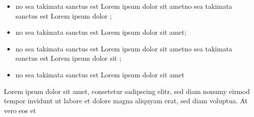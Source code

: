 \documentclass[]{../metanetpaper}
\begin{document}
\begin{Parallel}[c]{80mm}{80mm}
{\begin{itemize}
      \item no sea takimata sanctus est Lorem ipsum dolor sit ametno sea takimata sanctus est Lorem ipsum dolor ;
      \item no sea takimata sanctus est Lorem ipsum dolor sit amet;
      \item no sea takimata sanctus est Lorem ipsum dolor sit ametno sea takimata sanctus est Lorem ipsum dolor sit ;
      \item no sea takimata sanctus est Lorem ipsum dolor sit amet 
    \end{itemize}
    Lorem ipsum dolor sit amet, consetetur sadipscing elitr, sed diam nonumy eirmod tempor invidunt ut labore et dolore magna aliquyam erat, sed diam voluptua. At vero eos et
  }

\end{Parallel}
\end{document}
